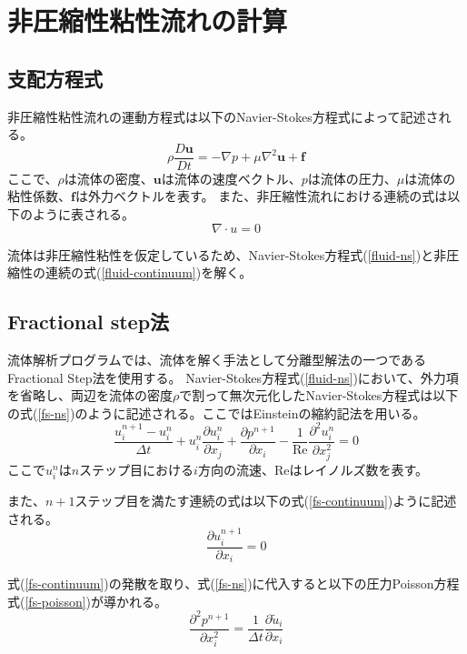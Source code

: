 \newpage
\section{非圧縮性粘性流れの計算}
\subsection{支配方程式}
非圧縮性粘性流れの運動方程式は以下のNavier-Stokes方程式によって記述される。
\begin{equation}
\label{fluid-ns}
\rho \frac{D\bm{u}}{Dt} = - \nabla p + \mu \nabla^{2} \bm{u} + \bm{f}
\end{equation}
ここで、$\rho$は流体の密度、$\bm{u}$は流体の速度ベクトル、$p$は流体の圧力、$\mu$は流体の粘性係数、$\bm{f}$は外力ベクトルを表す。
また、非圧縮性流れにおける連続の式は以下のように表される。
\begin{equation}
\label{fluid-continuum}
\nabla \cdot u = 0
\end{equation}

流体は非圧縮性粘性を仮定しているため、Navier-Stokes方程式(\ref{fluid-ns})と非圧縮性の連続の式(\ref{fluid-continuum})を解く。

\subsection{Fractional step法}
流体解析プログラムでは、流体を解く手法として分離型解法の一つであるFractional Step法を使用する。
Navier-Stokes方程式(\ref{fluid-ns})において、外力項を省略し、両辺を流体の密度$\rho$で割って無次元化したNavier-Stokes方程式は以下の式(\ref{fs-ns})のように記述される。ここではEinsteinの縮約記法を用いる。
\begin{equation}
\label{fs-ns}
	\frac{u^{n+1}_i - u^{n}_i}{\Delta t} + u^{n}_i \frac{\partial u^{n}_i}{\partial x_j}
	+ \frac{\partial p^{n+1}}{\partial x_i} - \frac{1}{\mathrm{Re}} \frac{\partial^{2} u^{n}_i}{\partial x^{2}_j} = 0
\end{equation}
ここで$u^{n}_{i}$は$n$ステップ目における$i$方向の流速、$\mathrm{Re}$はレイノルズ数を表す。

また、$n+1$ステップ目を満たす連続の式は以下の式(\ref{fs-continuum})ように記述される。
\begin{equation}
\label{fs-continuum}
	\frac{\partial u_{i}^{n+1}}{\partial x_{i}}=0
\end{equation}

式(\ref{fs-continuum})の発散を取り、式(\ref{fs-ns})に代入すると以下の圧力Poisson方程式(\ref{fs-poisson})が導かれる。
\begin{equation}
\label{fs-poisson}
	\frac{\partial^2 p^{n+1}}{\partial x^{2}_i} = \frac{1}{\Delta t} \frac{\partial \tilde{u}_i}{\partial x_{i}}
\end{equation}

